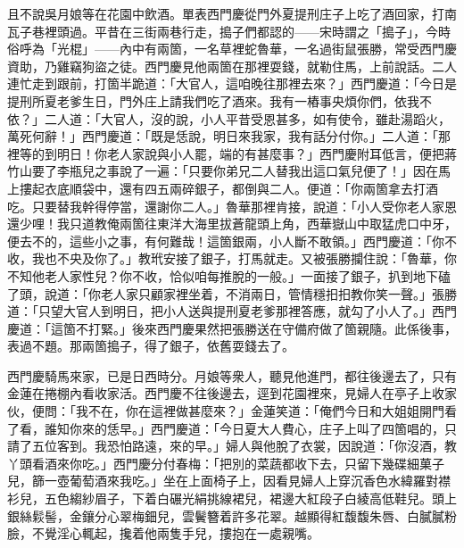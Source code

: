 且不說吳月娘等在花園中飲酒。單表西門慶從門外夏提刑庄子上吃了酒回家，打南瓦子巷裡頭過。平昔在三街兩巷行走，搗子們都認的——宋時謂之「搗子」，今時俗呼為「光棍」——內中有兩箇，一名草裡蛇魯華，一名過街鼠張勝，常受西門慶資助，乃雞竊狗盜之徒。西門慶見他兩箇在那裡耍錢，就勒住馬，上前說話。二人連忙走到跟前，打箇半跪道：「大官人，這咱晚往那裡去來？」西門慶道：「今日是提刑所夏老爹生日，門外庄上請我們吃了酒來。我有一樁事央煩你們，依我不依？」二人道：「大官人，沒的說，小人平昔受恩甚多，如有使令，雖赴湯蹈火，萬死何辭！」西門慶道：「既是恁說，明日來我家，我有話分付你。」二人道：「那裡等的到明日！你老人家說與小人罷，端的有甚麼事？」西門慶附耳低言，便把蔣竹山要了李瓶兒之事說了一遍：「只要你弟兄二人替我出這口氣兒便了！」因在馬上摟起衣底順袋中，還有四五兩碎銀子，都倒與二人。便道：「你兩箇拿去打酒吃。只要替我幹得停當，還謝你二人。」魯華那裡肯接，說道：「小人受你老人家恩還少哩！我只道教俺兩箇往東洋大海里拔蒼龍頭上角，西華嶽山中取猛虎口中牙，便去不的，這些小之事，有何難哉！這箇銀兩，小人斷不敢領。」西門慶道：「你不收，我也不央及你了。」教玳安接了銀子，打馬就走。又被張勝攔住說：「魯華，你不知他老人家性兒？你不收，恰似咱每推脫的一般。」一面接了銀子，扒到地下磕了頭，說道：「你老人家只顧家裡坐着，不消兩日，管情穩抇抇教你笑一聲。」{}張勝道：「只望大官人到明日，把小人送與提刑夏老爹那裡答應，就勾了小人了。」西門慶道：「這箇不打緊。」後來西門慶果然把張勝送在守備府做了箇親隨。{}此係後事，表過不題。那兩箇搗子，得了銀子，依舊耍錢去了。

西門慶騎馬來家，已是日西時分。月娘等衆人，聽見他進門，都往後邊去了，只有金蓮在捲棚內看收家活。西門慶不往後邊去，逕到花園裡來，見婦人在亭子上收家伙，便問：「我不在，你在這裡做甚麼來？」金蓮笑道：「俺們今日和大姐姐開門看了看，誰知你來的恁早。」西門慶道：「今日夏大人費心，庄子上叫了四箇唱的，只請了五位客到。我恐怕路遠，來的早。」婦人與他脫了衣裳，因說道：「你沒酒，教丫頭看酒來你吃。」西門慶分付春梅：「把別的菜蔬都收下去，只留下幾碟細菓子兒，篩一壺葡萄酒來我吃。」坐在上面椅子上，因看見婦人上穿沉香色水緯羅對襟衫兒，五色縐紗眉子，下着白碾光絹挑線裙兒，裙邊大紅段子白綾高低鞋兒。頭上銀絲鬏髻，金鑲分心翠梅鈿兒，雲鬢簪着許多花翠。越顯得紅馥馥朱唇、白膩膩粉臉，{}不覺淫心輒起，攙着他兩隻手兒，摟抱在一處親嘴。

